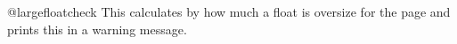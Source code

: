% 
%
  \begin{docCommand}{@largefloatcheck} {}
% 
    This calculates by how much a float is oversize for the page and
    prints this in a warning message.
%    
    \begin{teX}  
\def \@largefloatcheck{%
  \ifdim \ht\@currbox>\textheight
    \@tempdima -\textheight
    \advance \@tempdima \ht\@currbox
    \end{teX}
    \begin{teX}
    \@latex@warning {Float too large for page by \the\@tempdima}%
    \ht\@currbox \textheight
  \fi
}
    \end{teX}
  \end{docCommand}
%
%    
%
    \begin{teX}
\def\@dbflt#1{\@ifnextchar[{\@xdblfloat{#1}}{\@xdblfloat{#1}[tp]}}
\def\@xdblfloat#1[#2]{%
  \@xfloat{#1}[#2]\hsize\textwidth\linewidth\textwidth}
    \end{teX}
%
%
    \begin{teX}
    \end{teX}
%
%
    \begin{teX}
\def\@floatplacement{\global\@topnum\c@topnumber
   \global\@toproom \topfraction\@colht
   \global\@botnum  \c@bottomnumber
   \global\@botroom \bottomfraction\@colht
   \global\@colnum  \c@totalnumber
   \@fpmin   \floatpagefraction\@colht}
    \end{teX}
%
